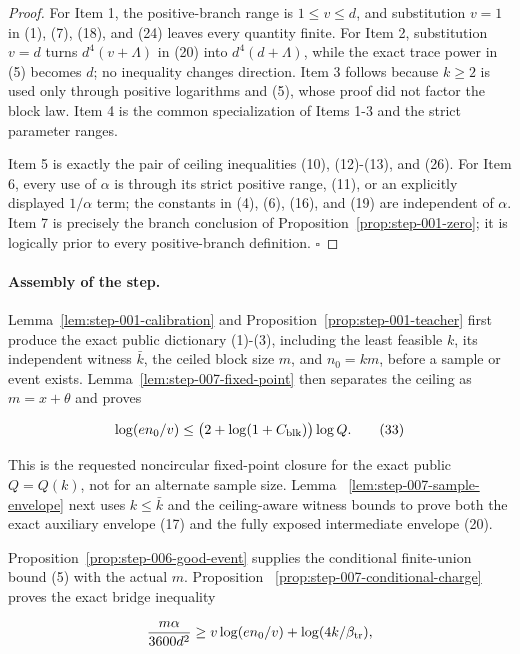 \begin{proof}
For Item 1, the  positive-branch range is
\(1\le v\le d\), and substitution \(v=1\) in (1), (7), (18), and (24)
leaves every quantity finite. For Item 2, substitution \(v=d\) turns
\(d^4(v+\Lambda)\) in (20) into \(d^4(d+\Lambda)\), while the exact trace
power in (5) becomes \(d\); no inequality changes direction. Item 3 follows
because \(k\ge2\) is used only through positive logarithms and 
(5), whose proof did not factor the block law. Item 4 is the common
specialization of Items 1-3 and the strict parameter ranges.

Item 5 is exactly the pair of ceiling inequalities (10), (12)-(13), and
(26). For Item 6, every use of \(\alpha\) is through its strict positive
range, (11), or an explicitly displayed \(1/\alpha\) term; the constants in
(4), (6), (16), and (19) are independent of \(\alpha\). Item 7 is precisely
the branch conclusion of Proposition~\ref{prop:step-001-zero}; it is logically prior to every
positive-branch definition. \(\square\)


\end{proof}

\paragraph{Assembly of the step.}


Lemma~\ref{lem:step-001-calibration} and Proposition~\ref{prop:step-001-teacher} first produce the exact public
dictionary (1)-(3), including the least feasible \(k\), its independent
witness \(\bar k\), the ceiled block size \(m\), and \(n_0=km\), before a
sample or event exists. Lemma~\ref{lem:step-007-fixed-point} then separates
the ceiling as \(m=x+\theta\) and proves

\[
 \log(en_0/v)
 \le\bigl(2+\log(1+C_{\rm blk})\bigr)\log Q.
\tag{33}
\]

This is the requested noncircular fixed-point closure for the exact public
\(Q=Q(k)\), not for an alternate sample size. Lemma
~\ref{lem:step-007-sample-envelope} next uses \(k\le\bar k\) and the
 ceiling-aware witness bounds to prove both the exact auxiliary
envelope (17) and the fully exposed intermediate envelope (20).

Proposition~\ref{prop:step-006-good-event} supplies the conditional
finite-union bound (5) with the actual \(m\). Proposition
~\ref{prop:step-007-conditional-charge} proves the exact bridge inequality

\[
 \frac{m\alpha}{3600d^2}
 \ge v\log(en_0/v)+\log(4k/\beta_{\rm tr}),
\]

